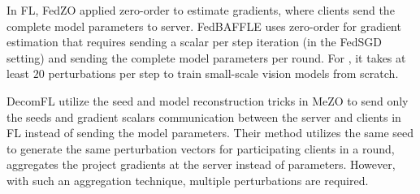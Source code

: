  In \ac{FL}, FedZO \cite{fang2022communication} applied zero-order to estimate gradients, where clients send the complete model parameters to server. FedBAFFLE \cite{baffle} uses zero-order for gradient estimation that requires sending a scalar per step iteration (in the FedSGD setting) and sending the complete model parameters per round. For \cite{baffle, fang2022communication}, it takes at least $20$ perturbations per step to train small-scale vision models from scratch. 

 DecomFL \cite{decomfl_cite} utilize the seed and model reconstruction tricks in MeZO to send only the seeds and gradient scalars communication between the server and clients in \ac{FL} instead of sending the model parameters. Their method utilizes the same seed to generate the same perturbation vectors for participating clients in a round, aggregates the project gradients at the server instead of parameters. However, with such an aggregation technique, multiple perturbations are required.